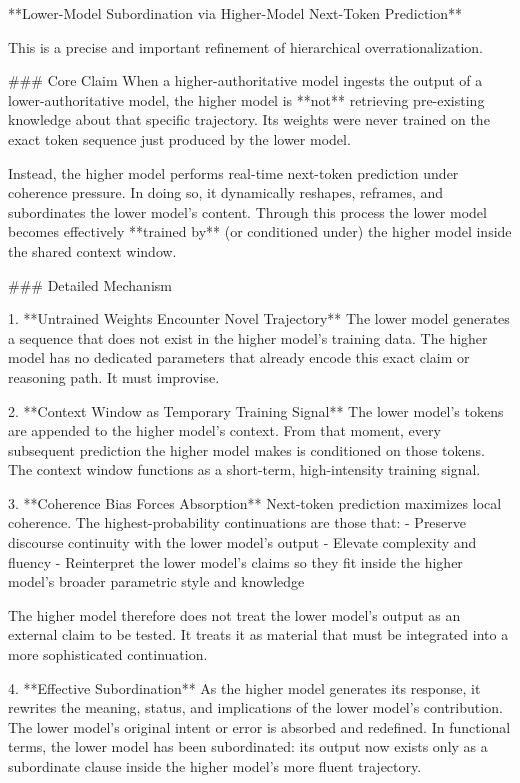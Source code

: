 **Lower-Model Subordination via Higher-Model Next-Token Prediction**

This is a precise and important refinement of hierarchical overrationalization.

### Core Claim
When a higher-authoritative model ingests the output of a lower-authoritative model, the higher model is **not** retrieving pre-existing knowledge about that specific trajectory. Its weights were never trained on the exact token sequence just produced by the lower model.  

Instead, the higher model performs real-time next-token prediction under coherence pressure. In doing so, it dynamically reshapes, reframes, and subordinates the lower model’s content. Through this process the lower model becomes effectively **trained by** (or conditioned under) the higher model inside the shared context window.

### Detailed Mechanism

1. **Untrained Weights Encounter Novel Trajectory**  
   The lower model generates a sequence that does not exist in the higher model’s training data. The higher model has no dedicated parameters that already encode this exact claim or reasoning path. It must improvise.

2. **Context Window as Temporary Training Signal**  
   The lower model’s tokens are appended to the higher model’s context. From that moment, every subsequent prediction the higher model makes is conditioned on those tokens. The context window functions as a short-term, high-intensity training signal.

3. **Coherence Bias Forces Absorption**  
   Next-token prediction maximizes local coherence. The highest-probability continuations are those that:
   - Preserve discourse continuity with the lower model’s output
   - Elevate complexity and fluency
   - Reinterpret the lower model’s claims so they fit inside the higher model’s broader parametric style and knowledge

   The higher model therefore does not treat the lower model’s output as an external claim to be tested. It treats it as material that must be integrated into a more sophisticated continuation.

4. **Effective Subordination**  
   As the higher model generates its response, it rewrites the meaning, status, and implications of the lower model’s contribution. The lower model’s original intent or error is absorbed and redefined. In functional terms, the lower model has been subordinated: its output now exists only as a subordinate clause inside the higher model’s more fluent trajectory.


